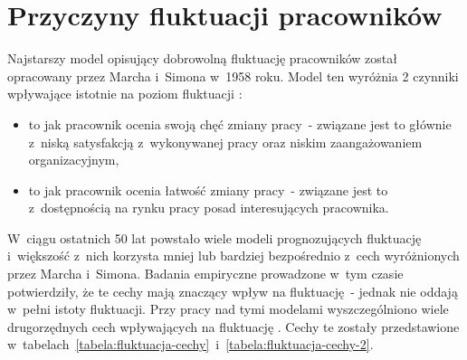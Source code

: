 \clearpage


\section{Przyczyny fluktuacji pracowników}\label{sec:czynniki-wplywajace-na-fluktuacje}

Najstarszy model opisujący dobrowolną fluktuację pracowników został opracowany przez Marcha i~Simona w~1958 roku.
Model ten wyróżnia 2 czynniki wpływające istotnie na poziom fluktuacji \cite{wozniak-2012}:
\begin{itemize}
    \item to jak pracownik ocenia swoją chęć zmiany pracy~- związane jest to głównie z~niską satysfakcją z~wykonywanej pracy oraz niskim zaangażowaniem organizacyjnym,
    \item to jak pracownik ocenia łatwość zmiany pracy~- związane jest to z~dostępnością na rynku pracy posad interesujących pracownika.
\end{itemize}

W~ciągu ostatnich 50 lat powstało wiele modeli prognozujących fluktuację i~większość z~nich korzysta mniej lub bardziej bezpośrednio z~cech wyróżnionych przez Marcha i~Simona.
Badania empiryczne prowadzone w~tym czasie potwierdziły, że te cechy mają znaczący wpływ na fluktuację~- jednak nie oddają w~pełni istoty fluktuacji.
Przy pracy nad tymi modelami wyszczególniono wiele drugorzędnych cech wpływających na fluktuację \cite{steel-2009}.
Cechy te zostały przedstawione w~tabelach~\ref{tabela:fluktuacja-cechy}~i~\ref{tabela:fluktuacja-cechy-2}.

